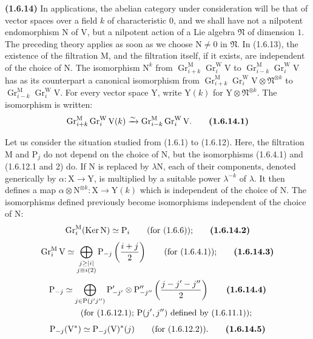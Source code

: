 \documentclass[11pt,leqno]{article}
\newcommand{\Page}[1]{\ifvmode\noindent\else\unskip\ \fi{\footnotesize\textcolor{gray}{[p.\,#1]}}\ \ignorespaces}
\begin{document}
\textbf{(1.6.14)} In applications, the abelian category under consideration will be that of vector spaces over a field \(k\) of characteristic \(0\), and we shall have not a nilpotent endomorphism \(\mathrm{N}\) of \(\mathrm{V}\), but a nilpotent action of a Lie algebra \(\mathfrak{N}\) of dimension \(1\). The preceding theory applies as soon as we choose \(\mathrm{N}\neq0\) in \(\mathfrak{N}\). In (1.6.13), the existence of the filtration \(\mathrm{M}\), and the filtration itself, if it exists, are independent of the choice of \(\mathrm{N}\). The isomorphism \(\mathrm{N}^k\) from \(\operatorname{Gr}_{i+k}^{\mathrm{M}}\operatorname{Gr}_i^{\mathrm{W}}\mathrm{V}\) to \(\operatorname{Gr}_{i-k}^{\mathrm{M}}\operatorname{Gr}_i^{\mathrm{W}}\mathrm{V}\) has as its counterpart a canonical isomorphism from \(\operatorname{Gr}_{i+k}^{\mathrm{M}}\operatorname{Gr}_i^{\mathrm{W}}\mathrm{V}\otimes\mathfrak{N}^{\otimes k}\) to \(\operatorname{Gr}_{i-k}^{\mathrm{M}}\operatorname{Gr}_i^{\mathrm{W}}\mathrm{V}\). For every vector space \(\mathrm{Y}\), write \(\mathrm{Y}(k)\) for \(\mathrm{Y}\otimes\mathfrak{N}^{\otimes k}\). The isomorphism is written:
\[
\operatorname{Gr}_{i+k}^{\mathrm{M}}\operatorname{Gr}_i^{\mathrm{W}}\mathrm{V}(k)
\xrightarrow{\sim}
\operatorname{Gr}_{i-k}^{\mathrm{M}}\operatorname{Gr}_i^{\mathrm{W}}\mathrm{V}.
\tag*{\textbf{(1.6.14.1)}}
\]

Let us consider the situation studied from (1.6.1) to (1.6.12). Here, the filtration \(\mathrm{M}\) and \(\mathrm{P}_j\) do not depend on the choice of \(\mathrm{N}\), but the isomorphisms (1.6.4.1) and (1.6.12.1 and 2) do. If \(\mathrm{N}\) is replaced by \(\lambda\mathrm{N}\), each of their components, denoted generically by \(\alpha:\mathrm{X}\to\mathrm{Y}\), is multiplied by a suitable power \(\lambda^{-k}\) of \(\lambda\). It then defines a map \(\alpha\otimes\mathrm{N}^{\otimes k}:\mathrm{X}\to\mathrm{Y}(k)\) which is independent of the choice of \(\mathrm{N}\). The isomorphisms defined previously become isomorphisms independent of the choice of \(\mathrm{N}\):
\Page{170}
\[
\operatorname{Gr}_i^{\mathrm{M}}(\operatorname{Ker}\mathrm{N})
\simeq\mathrm{P}_i
\qquad\text{(for (1.6.6));}
\tag*{\textbf{(1.6.14.2)}}
\]
\[
\operatorname{Gr}_i^{\mathrm{M}}\mathrm{V}
\simeq
\bigoplus_{\substack{j\geq|i|\\j\equiv i(2)}}
\mathrm{P}_{-j}\left(\frac{i+j}{2}\right)
\qquad\text{(for (1.6.4.1));}
\tag*{\textbf{(1.6.14.3)}}
\]
\begin{align*}
\mathrm{P}_{-j}
&\simeq
\bigoplus_{j\in\mathrm{P}(j'j'')}
\mathrm{P}'_{-j'}\otimes\mathrm{P}''_{-j''}
\left(\frac{j-j'-j''}{2}\right)
\tag*{\textbf{(1.6.14.4)}}\\
&\qquad\text{(for (1.6.12.1); }\mathrm{P}(j',j'')
\text{ defined by (1.6.11.1));}
\end{align*}
\[
\mathrm{P}_{-j}(\mathrm{V}^*)
\simeq\mathrm{P}_{-j}(\mathrm{V})^*(j)
\qquad\text{(for (1.6.12.2)).}
\tag*{\textbf{(1.6.14.5)}}
\]
\end{document}
